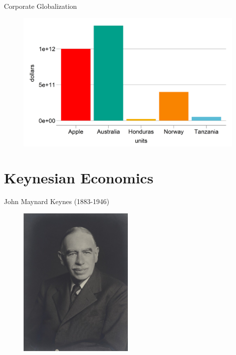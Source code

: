 \documentclass{beamer}
\begin{document}
\begin{frame}{Corporate Globalization} 
\begin{figure}
    \centering
    \includegraphics[width=\textwidth]{../img/value.png} %
    \label{fig:value}
\end{figure}
\end{frame}

\section{Keynesian Economics}
\begin{frame}{John Maynard Keynes (1883-1946)} 
    \begin{figure}
        \centering
        \includegraphics[width=0.5\textwidth]{../img/Lord_Keynes.jpg}
    \end{figure}{}
\end{frame}
\end{document}
